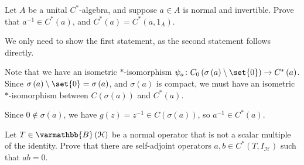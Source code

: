 \documentclass[10pt]{mypackage}
\renewcommand*{\mathbb}[1]{\varmathbb{#1}}
\newcommand{\B}{\mathbb{B}}
\begin{document}
\begin{exercise}
  Let $A$ be a unital $C^{\ast}$-algebra, and suppose $a\in A$ is normal and invertible. Prove that $a^{-1}\in C^{\ast}\left(a\right)$, and $C^{\ast}\left(a\right) = C^{\ast}\left(a,1_A\right)$.
\end{exercise}
\begin{solution}
  We only need to show the first statement, as the second statement follows directly.\newline

  Note that we have an isometric $\ast$-isomorphism $\psi_a\colon C_0\left(\sigma\left(a\right)\setminus \set{0}\right)\rightarrow C^{\ast}\left(a\right)$. Since $\sigma\left(a\right)\setminus \set{0} = \sigma\left(a\right)$, and $\sigma\left(a\right)$ is compact, we must have an isometric $\ast$-isomorphism between $C\left(\sigma\left(a\right)\right)$ and $C^{\ast}\left(a\right)$.\newline

  Since $0\notin \sigma\left(a\right)$, we have $g(z) = z^{-1}\in C\left(\sigma\left(a\right)\right)$, so $a^{-1}\in C^{\ast}\left(a\right)$.
\end{solution}
\begin{exercise}
  Let $T\in \B\left(\mathcal{H}\right)$ be a normal operator that is not a scalar multiple of the identity. Prove that there are self-adjoint operators $a,b\in C^{\ast}\left(T,I_{\mathcal{H}}\right)$ such that $ab = 0$.
\end{exercise}
\end{document}
